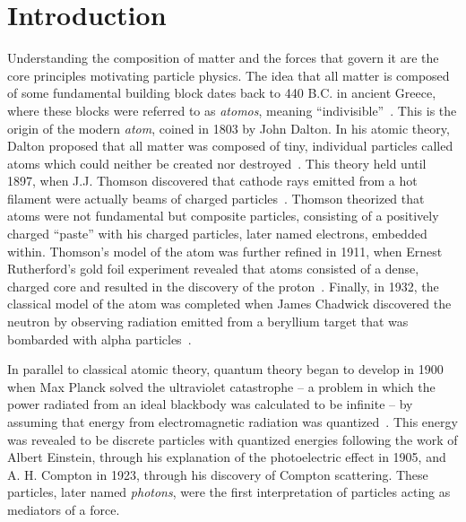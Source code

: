 
\chapter{Introduction}
\label{chap:intro}
Understanding the composition of matter and the forces that govern it are the core principles motivating particle physics. The idea that all matter is composed of some fundamental building block dates back to 440 B.C. in ancient Greece, where these blocks were referred to as \textit{atomos}, meaning ``indivisible''~\cite{wolfgang2019}. This is the origin of the modern \textit{atom}, coined in 1803 by John Dalton. In his atomic theory, Dalton proposed that all matter was composed of tiny, individual particles called atoms which could neither be created nor destroyed~\cite{oed_physics}. This theory held until 1897, when J.J. Thomson discovered that cathode rays emitted from a hot filament were actually beams of charged particles~\cite{thomson_electron}. Thomson theorized that atoms were not fundamental but composite particles, consisting of a positively charged ``paste'' with his charged particles, later named electrons, embedded within. Thomson's model of the atom was further refined in 1911, when Ernest Rutherford's gold foil experiment revealed that atoms consisted of a dense, charged core and resulted in the discovery of the proton~\cite{rutherford}. Finally, in 1932, the classical model of the atom was completed when James Chadwick discovered the neutron by observing radiation emitted from a beryllium target that was bombarded with alpha particles~\cite{chadwick}.

In parallel to classical atomic theory, quantum theory began to develop in 1900 when Max Planck solved the ultraviolet catastrophe -- a problem in which the power radiated from an ideal blackbody was calculated to be infinite -- by assuming that energy from electromagnetic radiation was quantized~\cite{kittel1980thermal}. This energy was revealed to be discrete particles with quantized energies following the work of Albert Einstein, through his explanation of the photoelectric effect in 1905, and A. H. Compton in 1923, through his discovery of Compton scattering. These particles, later named \textit{photons}, were the first interpretation of particles acting as mediators of a force.

